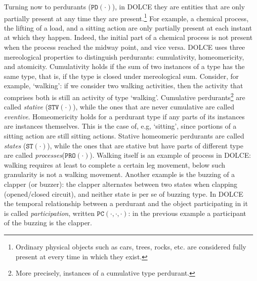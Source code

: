 \documentclass[sw]{iosart2x}
\newcommand{\generalStyle}[1]{\texttt{#1}}
\newcommand{\uniRel}[2]{\generalStyle{#1}(#2)}
\newcommand{\triRel}[4]{\generalStyle{#1}(#2,#3,#4)}
\newcommand{\DOLCE}{\textsc{DOLCE}\xspace} %
\newcommand{\DOLCEState}[1]{\uniRel{{ST}}{#1}}
\newcommand{\DOLCEProcess}[1]{\uniRel{PRO}{#1}}
\newcommand{\DOLCEPerdurant}[1]{\uniRel{{PD}}{#1}}
\newcommand{\DOLCEStative}[1]{\uniRel{{STV}}{#1}}
\newcommand{\DOLCEPC}[3]{\triRel{{PC}}{#1}{#2}{#3}}
\newcommand{\firstTimeKeyWord}[1]{\textit{#1}}
\newcommand{\quotes}[1]{`#1'}
\newcommand{\TODO}[1]{{%
}}
\newcommand{\myComment}[1]{{\unskip \ignorespaces}}
\begin{document}
Turning now to perdurants ($\DOLCEPerdurant{\cdot}$)\myComment{, which we will also refer to as occurrents in this paper\TODO{S: perché creiamo questa potenziale confusione terminologica? possiamo evitarla?[FC: sì, l'unica cosa è che ogni tanto il verbo 'to occur' no ha alternative. Però i sostantivi 'occurrent(s)' si potrebbero sostituire coi sostantivi 'perdurant(s)']}}, in \DOLCE they are entities that are only partially present at any time they are present.\footnote{Ordinary physical objects such as cars, trees, rocks, etc. are considered fully present at every time in which they exist.} For example, a chemical process, the lifting of a load, and a sitting action are only partially present at each instant at which they happen. Indeed, the initial part of a chemical process is not present when the process reached the midway point, and vice versa.  %
\DOLCE uses three mereological properties to distinguish perdurants: cumulativity, homeomericity, and atomicity.
Cumulativity holds if the sum of two instances of a type has the same type, that is, if the type is closed under mereological sum. Consider, for example, \quotes{walking}: if we consider two walking activities, then the activity that comprises both is still an activity of type \quotes{walking}.
Cumulative perdurants\footnote{More precisely, instances of a cumulative type perdurant.} are called \firstTimeKeyWord{stative} ($\DOLCEStative{\cdot}$), while the ones that are never cumulative are called \firstTimeKeyWord{eventive}.
Homeomericity holds for a perdurant type if any parts of its instances are instances themselves.
This is the case of, e.g, \quotes{sitting}, since portions of a sitting action are still sitting actions.
Stative homeomeric perdurants are called \firstTimeKeyWord{states} ($\DOLCEState{\cdot}$), while the ones that are stative but have parts of different type are called \firstTimeKeyWord{processes}($\DOLCEProcess{\cdot}$). Walking itself is an example of process in \DOLCE: walking requires at least to complete a certain leg movement, below such granularity is not a walking movement.
Another example is the buzzing of a clapper (or buzzer): the clapper alternates between two states when clapping (opened/closed circuit), and neither state is per se of buzzing type. In \DOLCE the temporal relationship between a perdurant and the object participating in it is called \firstTimeKeyWord{participation}, written $\DOLCEPC{\cdot}{\cdot}{\cdot}$: in the previous example a participant of the buzzing is the clapper.
\end{document}
